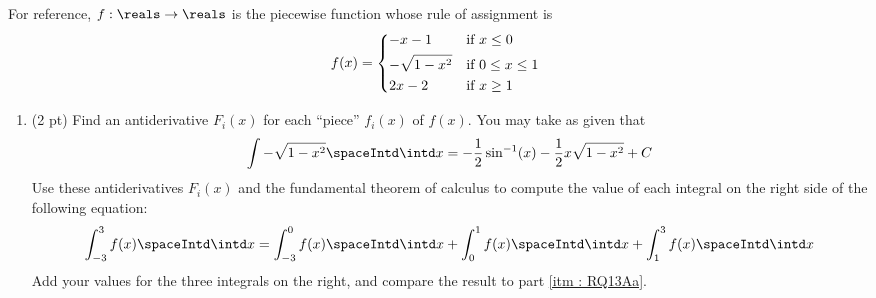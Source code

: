 \spaceSolution{1in}{%
}%



\noindent{}For reference, $f : \reals \rightarrow \reals$ is the piecewise function whose rule of assignment is
\begin{align*}
f(x)
=
\begin{dcases*}
-x - 1			&	if $x \leq 0$		\\
-\sqrt{1 - x^{2}}	&	if $0 \leq x \leq 1$	\\
2 x - 2		&	if $x \geq 1$
\end{dcases*}
\end{align*}

\begin{enumerate}[resume,label=(\alph*)]
\item\label{itm : RQ13Ac} (2 pt) Find an antiderivative $F_{i}(x)$ for each ``piece'' $f_{i}(x)$ of $f(x)$. You may take as given that
\begin{align*}
\int -\sqrt{1 - x^{2}} \spaceIntd \intd x
=
-\frac{1}{2} \sin^{-1}(x) - \frac{1}{2} x \sqrt{1 - x^{2}} + C
\end{align*}
Use these antiderivatives $F_{i}(x)$ and the fundamental theorem of calculus to compute the value of each integral on the right side of the following equation:
\begin{align*}
\int_{-3}^{3} f(x) \spaceIntd \intd x
=
\int_{-3}^{0} f(x) \spaceIntd \intd x
+
\int_{0}^{1} f(x) \spaceIntd \intd x
+
\int_{1}^{3} f(x) \spaceIntd \intd x%
\end{align*}
Add your values for the three integrals on the right, and compare the result to part \ref{itm : RQ13Aa}.
\end{enumerate}

\spaceSolution{3in}{%
}%
